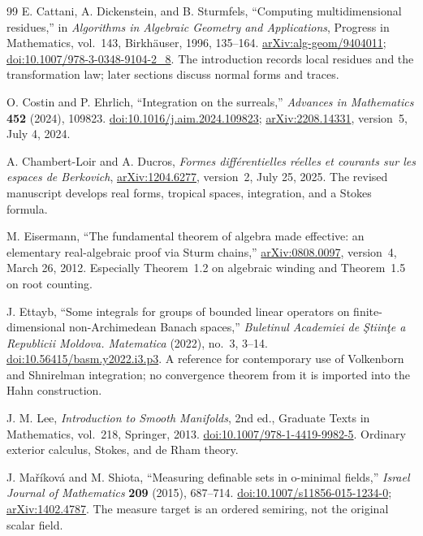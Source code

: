 \documentclass[11pt,letterpaper]{article}
\theoremstyle{definition}
\theoremstyle{remark}
\numberwithin{equation}{section}
\begin{document}
\begin{thebibliography}{99}
E. Cattani, A. Dickenstein, and B. Sturmfels,
``Computing multidimensional residues,'' in \emph{Algorithms in Algebraic Geometry and Applications}, Progress in Mathematics, vol.~143, Birkh\"auser, 1996, 135--164.
\href{https://arxiv.org/abs/alg-geom/9404011}{arXiv:alg-geom/9404011};
\href{https://doi.org/10.1007/978-3-0348-9104-2_8}{doi:10.1007/978-3-0348-9104-2\_8}.
The introduction records local residues and the transformation law; later sections discuss normal forms and traces.

O. Costin and P. Ehrlich,
``Integration on the surreals,''
\emph{Advances in Mathematics} \textbf{452} (2024), 109823.
\href{https://doi.org/10.1016/j.aim.2024.109823}{doi:10.1016/j.aim.2024.109823};
\href{https://arxiv.org/abs/2208.14331}{arXiv:2208.14331}, version~5, July 4, 2024.

A. Chambert-Loir and A. Ducros,
\emph{Formes diff\'erentielles r\'eelles et courants sur les espaces de Berkovich},
\href{https://arxiv.org/abs/1204.6277}{arXiv:1204.6277}, version~2, July 25, 2025.
The revised manuscript develops real forms, tropical spaces, integration, and a Stokes formula.

M. Eisermann,
``The fundamental theorem of algebra made effective: an elementary real-algebraic proof via Sturm chains,''
\href{https://arxiv.org/abs/0808.0097}{arXiv:0808.0097}, version~4, March 26, 2012.
Especially Theorem~1.2 on algebraic winding and Theorem~1.5 on root counting.

J. Ettayb,
``Some integrals for groups of bounded linear operators on finite-dimensional non-Archimedean Banach spaces,''
\emph{Buletinul Academiei de \c Stiin\c te a Republicii Moldova. Matematica} (2022), no.~3, 3--14.
\href{https://doi.org/10.56415/basm.y2022.i3.p3}{doi:10.56415/basm.y2022.i3.p3}.
A reference for contemporary use of Volkenborn and Shnirelman integration; no convergence theorem from it is imported into the Hahn construction.

J. M. Lee,
\emph{Introduction to Smooth Manifolds}, 2nd ed., Graduate Texts in Mathematics, vol.~218, Springer, 2013.
\href{https://doi.org/10.1007/978-1-4419-9982-5}{doi:10.1007/978-1-4419-9982-5}.
Ordinary exterior calculus, Stokes, and de Rham theory.

J. Ma\v r\'{i}kov\'{a} and M. Shiota,
``Measuring definable sets in o-minimal fields,''
\emph{Israel Journal of Mathematics} \textbf{209} (2015), 687--714.
\href{https://doi.org/10.1007/s11856-015-1234-0}{doi:10.1007/s11856-015-1234-0};
\href{https://arxiv.org/abs/1402.4787}{arXiv:1402.4787}.
The measure target is an ordered semiring, not the original scalar field.


\end{thebibliography}
\end{document}
